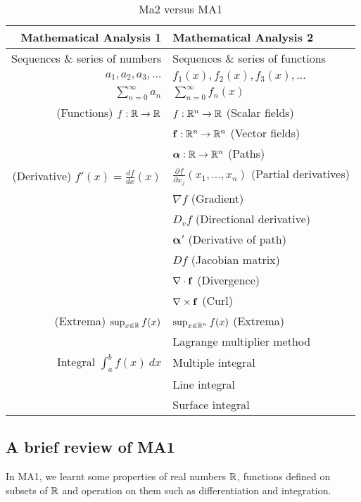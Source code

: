 \begin{table}
  \centering
  \begin{tabular}{r | l} %
    \textbf{Mathematical Analysis 1}
     &
    \textbf{Mathematical Analysis 2}  \\
    \midrule
    Sequences \& series of numbers
     &
    Sequences \& series  of functions \\
    \(a_1, a_2, a_3,\ldots \)
     &
    \(f_1(x), f_2(x), f_3(x),\ldots \)
    \\
    \(\sum_{n=0}^{\infty} a_n\)
     &
    \(\sum_{n=0}^{\infty} f_n(x)\)
    \\
    \midrule
    (Functions) \(f:\mathbb{R} \to \mathbb{R}\)
     &
    \(f:\mathbb{R}^n \to \mathbb{R}\) (Scalar fields)
    \\
     &
    \(\mathbf{f}:\mathbb{R}^n \to \mathbb{R}^n\) (Vector fields)
    \\
     &
    \(\boldsymbol{\alpha}:\mathbb{R} \to \mathbb{R}^n\) (Paths)
    \\
    \midrule
    (Derivative) \( f'(x) = \frac{df}{dx}(x)\)
     &
    \( \frac{\partial f}{\partial x_j}(x_1,\ldots,x_n)\) (Partial derivatives)
    \\
     &
    \(\nabla f\) (Gradient)
    \\
     &
    \(D_v f\) (Directional derivative)
    \\
     &
    \(\boldsymbol{\alpha}'\) (Derivative of path)
    \\
     &
    \(Df\) (Jacobian matrix)
    \\
     &
    \(\nabla \cdot \mathbf{f}\) (Divergence)
    \\
     &
    \(\nabla \times \mathbf{f}\) (Curl)
    \\
    \midrule
    (Extrema) \(\sup_{x\in \mathbb{R}} f(x)\)
     &
    \(\sup_{x\in \mathbb{R}^n} f(x)\) (Extrema)
    \\
     &
    Lagrange multiplier method
    \\
    \midrule
    Integral \(\int_{a}^{b} f(x) \ dx\)
     &
    Multiple integral
    \\
     &
    Line integral
    \\
     &
    Surface integral
  \end{tabular}
  \caption{Ma2 versus MA1}%
  \label{tab:2versus1}
\end{table}

\subsection*{A brief review of MA1}
In MA1, we learnt some properties of real numbers $\mathbb{R}$, functions defined on subsets of $\mathbb{R}$
and operation on them such as differentiation and integration.

